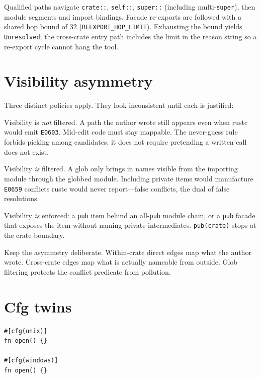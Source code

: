 \documentclass[11pt,a4paper,oneside]{report}
\begin{document}
Qualified paths navigate \texttt{crate::}, \texttt{self::}, \texttt{super::}
(including multi-\texttt{super}), then module segments and import bindings.
Facade re-exports are followed with a shared hop bound of 32
(\texttt{REEXPORT\_HOP\_LIMIT}). Exhausting the bound yields
\texttt{Unresolved}; the cross-crate entry path includes the limit in the
reason string so a re-export cycle cannot hang the tool.

\section{Visibility asymmetry}
\label{sec:visibility}

Three distinct policies apply. They look inconsistent until each is justified:

\begin{description}[style=nextline,leftmargin=1em]
  \item[Direct within-crate edges.] Visibility is \emph{not} filtered. A path
    the author wrote still appears even when rustc would emit \texttt{E0603}.
    Mid-edit code must stay mappable. The never-guess rule forbids picking
    among candidates; it does not require pretending a written call does not
    exist.
  \item[Glob candidate sets.] Visibility \emph{is} filtered. A glob only
    brings in names visible from the importing module through the globbed
    module. Including private items would manufacture \texttt{E0659} conflicts
    rustc would never report---false conflicts, the dual of false
    resolutions.
  \item[Cross-crate reachability.] Visibility \emph{is} enforced: a
    \texttt{pub} item behind an all-\texttt{pub} module chain, or a
    \texttt{pub} facade that exposes the item without naming private
    intermediates. \texttt{pub(crate)} stops at the crate boundary.
\end{description}

Keep the asymmetry deliberate. Within-crate direct edges map what the author
wrote. Cross-crate edges map what is actually nameable from outside. Glob
filtering protects the conflict predicate from pollution.

\section{Cfg twins}

\begin{lstlisting}
#[cfg(unix)]
fn open() {}

#[cfg(windows)]
fn open() {}
\end{lstlisting}
\end{document}
